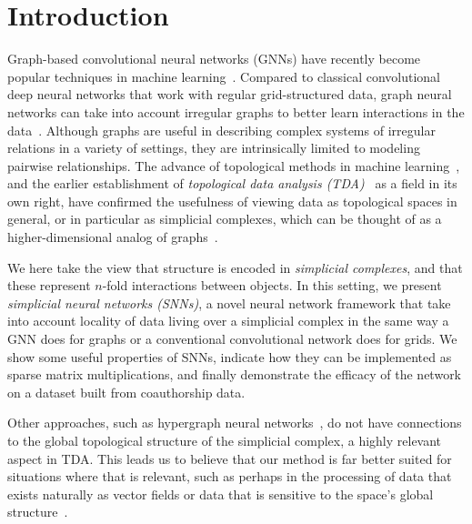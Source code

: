 \section{Introduction}

Graph-based convolutional neural networks (GNNs) have recently become popular techniques in machine learning~\cite{defferrard2016convolutional, bronstein2017geometric, wu2020survey}. Compared to classical convolutional deep neural networks that work with regular grid-structured data, graph neural networks can take into account irregular graphs to better learn interactions in the data~\cite{battaglia2018relational}. Although graphs are useful in describing complex systems of irregular relations in a variety of settings, they are intrinsically limited to modeling pairwise relationships. The advance of topological methods in machine learning~\cite{Gabrielsson2020topological, Hofer2019LearningRO, rieck2018neural}, and the earlier establishment of \emph{topological data analysis (TDA)}~\cite{carlsson2008,chazal2017,edelsbrunner2010computational,ghrist2008barcodes} as a field in its own right, have confirmed the usefulness of viewing data as topological spaces in general, or in particular as simplicial complexes, which can be thought of as a higher-dimensional analog of graphs~\cite{moore2012,patania2017}.

We here take the view that structure is encoded in \emph{simplicial complexes}, and that these represent $n$-fold interactions between objects. In this setting, we present \emph{simplicial neural networks (SNNs)}, a novel neural network framework that take into account locality of data living over a simplicial complex in the same way a GNN does for graphs or a conventional convolutional network does for grids. We show some useful properties of SNNs, indicate how they can be implemented as sparse matrix multiplications, and finally demonstrate the efficacy of the network on a dataset built from coauthorship data.

Other approaches, such as hypergraph neural networks~\cite{feng2018hypergraphs}, do not have connections to the global topological structure of the simplicial complex, a highly relevant aspect in TDA. This leads us to believe that our method is far better suited for situations where that is relevant, such as perhaps in the processing of data that exists naturally as vector fields or data that is sensitive to the space's global structure~\cite{perraudin2019deepsphere}.
